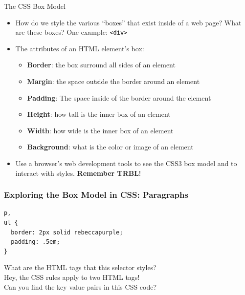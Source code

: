 \documentclass[14pt,aspectratio=169]{beamer}
\begin{document}
%
\begin{frame}{The CSS Box Model}
  \begin{itemize}
    \item How do we style the various ``boxes'' that exist inside of a web
      page? What are these boxes? One example: {\tt <div>}
      \vspace*{-.2in}
    \item The attributes of an HTML element's box:
      \begin{itemize}
        \item {\bf Border}: the box surround all sides of an element
        \item {\bf Margin}: the space outside the border around an element
        \item {\bf Padding}: The space inside of the border around the element
        \item {\bf Height}: how tall is the inner box of an element
        \item {\bf Width}: how wide is the inner box of an element
        \item {\bf Background}: what is the color or image of an element
      \end{itemize}
      \vspace*{-.2in}
    \item Use a browser's web development tools to see the CSS3 box model and
      to interact with styles. {\bf Remember TRBL}!
  \end{itemize}
\end{frame}

%
\begin{frame}[fragile]
  \frametitle{Exploring the Box Model in CSS: Paragraphs}
  \normalsize
  \hspace*{.25in}
  \begin{minipage}{6in}
    \vspace*{.2in}
    \begin{verbatim}
p,
ul {
  border: 2px solid rebeccapurple;
  padding: .5em;
}
    \end{verbatim}
  \end{minipage}
  \vspace*{.05in}
  \begin{center}
    \noindent What are the HTML tags that this selector styles? \\
    \noindent Hey, the CSS rules apply to two HTML tags! \\
    \noindent Can you find the key value pairs in this CSS code? \\
  \end{center}
\end{frame}
\end{document}
